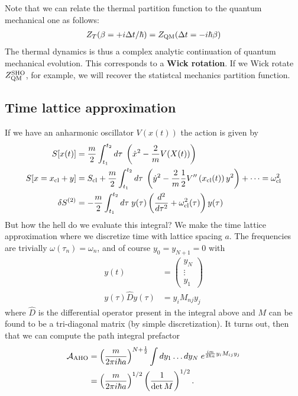 Note that we can relate the thermal partition function to the quantum mechanical one as follows:
\begin{align*}
    Z_T(\beta =+i\Delta t/\hbar)=Z_{\rm QM}(\Delta t=-i\hbar \beta)
\end{align*}
The thermal dynamics is thus a complex analytic continuation of quantum mechanical evolution. This corresponds to a \textbf{Wick rotation}. If we Wick rotate $Z_{\rm QM}^{\rm SHO}$, for example,
we will recover the statistcal mechanics partition function.

\subsection{Time lattice approximation}
If we have an anharmonic oscillator $V(x(t))$ the action is given by
\begin{align*}
    S[x(t)]&=\frac{m}{2}\int_{t_1}^{t_2} d\tau\;\left( \dot{x}^2-\frac{2}{m}V(X(t)) \right)\\
    S[x=x_{\rm cl}+y]&=S_{\rm cl}+\frac{m}{2}\int_{t_1}^{t_2}d\tau\;\left( \dot{y}^2-\frac{2}{m}\frac{1}{2}V''\left(x_{\rm cl}(t)\right)y^2 \right) + \dots=\omega^2_{\rm cl}\\
    \delta S^{(2)}&= -\frac{m}{2}\int_{t_1}^{t_2} d\tau\;y(\tau)\left( \frac{d^2}{d\tau^2}+\omega_{\rm cl}^2(\tau) \right)y(\tau)
\end{align*}
But how the hell do we evaluate this integral? We make the time lattice approximation where we discretize time with lattice spacing $a$.
The frequencies are trivially $\omega(\tau_n)=\omega_n$, and of course
$y_0=y_{N+1}=0$ with
\begin{align*}
    y(t)&=\begin{pmatrix}y_N\\\vdots\\y_1\end{pmatrix}\\
         y(\tau)\hat{D}y(\tau)&=y_iM_{nj}y_j
\end{align*}
where $\hat{D}$ is the differential operator present in the integral above and $M$ can be found to be a tri-diagonal matrix (by simple discretization). It turns out, then that we
can compute the path integral prefactor
\begin{align*}
    \mathcal{A}_{\rm AHO}&=\left( \frac{m}{2\pi i \hbar a} \right)^{N+\frac{1}{2}}\int dy_1\dots dy_N\; e^{\frac{im}{2\hbar a}y_iM_{ij}y_j}\\
    &=\left(\frac{m}{2\pi i \hbar a}\right)^{1/2}\left( \frac{1}{\det M} \right)^{1/2}.
\end{align*}
